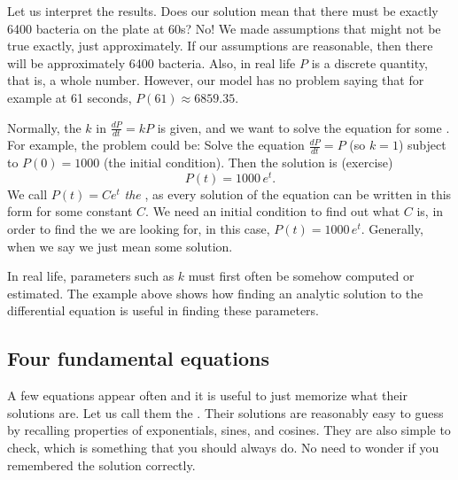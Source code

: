 \begin{example}


Let us interpret the results.  Does our solution
mean that
there must be exactly 6400 bacteria on the plate at 60s?  No!  We made
assumptions that might not be true exactly, just approximately.
If our assumptions are reasonable,
then there will be approximately 6400 bacteria.
Also, in real life $P$ is a
discrete quantity, that is, a whole number.  However, our model has no problem saying
that for example at 61 seconds, $P(61) \approx 6859.35$.
\end{example}

Normally, the $k$ in $\frac{dP}{dt} = kP$ is given,
and we want to solve
the equation for some \emph{}.
For example, the problem could be:
Solve the equation
$\frac{dP}{dt} = P$ (so $k=1$)
subject to $P(0) = 1000$ (the initial condition).
Then the solution is (exercise)
\begin{equation*}
P(t) = 1000 \, e^t .
\end{equation*}
We call $P(t) = C e^t$ \emph{the },
as every solution
of the equation can be written in this form for some constant $C$.  We
need an initial condition to find out what $C$ is, in order to find the
\emph{} we are looking for,
in this case, $P(t) = 1000\, e^t$.
Generally, when we say
 we just mean some solution.

In real life, parameters such as $k$
must first often be somehow computed or estimated.  The example above
shows how finding an analytic solution to the differential equation
is useful in finding these parameters.

\subsection{Four fundamental equations} \label{subsection:fourfundamental}

A few equations appear often and
it is useful to just memorize what
their solutions are.
Let us call them the .
Their solutions
are reasonably easy
to guess by recalling properties of exponentials, sines, and cosines.
They are also simple to check, which is something that you should always do.
No need to wonder if you remembered the solution correctly.

